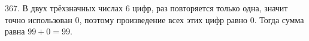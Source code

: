 367. В двух трёхзначных числах 6 цифр, раз повторяется только одна, значит точно использован 0, поэтому произведение всех этих цифр равно 0. Тогда сумма равна $99+0=99.$\\
